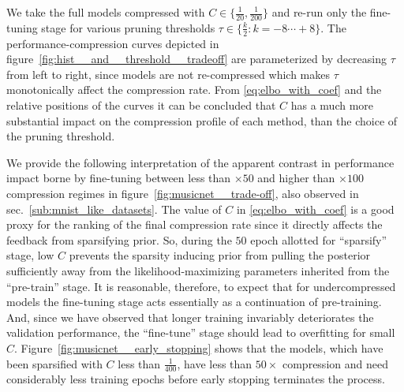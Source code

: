 \documentclass{article}
\begin{document}
We take the full models compressed with $C \in \{\tfrac1{20}, \frac1{200}\}$ and re-run
only the fine-tuning stage for various pruning thresholds $
  \tau \in \{\tfrac{k}2\colon k=-8\cdots+8\}
$. The performance-compression curves depicted in figure~\ref{fig:hist__and__threshold__tradeoff}
are parameterized by decreasing $\tau$ from left to right, since models are not re-compressed
which makes $\tau$ monotonically affect the compression rate. From \eqref{eq:elbo_with_coef}
and the relative positions of the curves it can be concluded that $C$ has a much more
substantial impact on the compression profile of each method, than the choice of the
pruning threshold.


We provide the following interpretation of the apparent contrast in performance impact
borne by fine-tuning between less than $\times50$ and higher than $\times100$ compression
regimes in figure~\ref{fig:musicnet__trade-off}, also observed in sec.~\ref{sub:mnist_like_datasets}.
%
The value of $C$ in \eqref{eq:elbo_with_coef} is a good proxy for the ranking of the
final compression rate since it directly affects the feedback from sparsifying prior.
So, during the $50$ epoch allotted for ``sparsify'' stage, low $C$ prevents the sparsity
inducing prior from pulling the posterior sufficiently away from the likelihood-maximizing
parameters inherited from the ``pre-train'' stage. It is reasonable, therefore, to expect
that for undercompressed models the fine-tuning stage acts essentially as a continuation
of pre-training. And, since we have observed that longer training invariably deteriorates
the validation performance, the ``fine-tune'' stage should lead to overfitting for small
$C$.
%
Figure~\ref{fig:musicnet__early_stopping} shows that the models, which have been sparsified
with $C$ less than $\tfrac1{400}$, have less than $50\times$ compression and need considerably
less training epochs before early stopping terminates the process.
\end{document}
